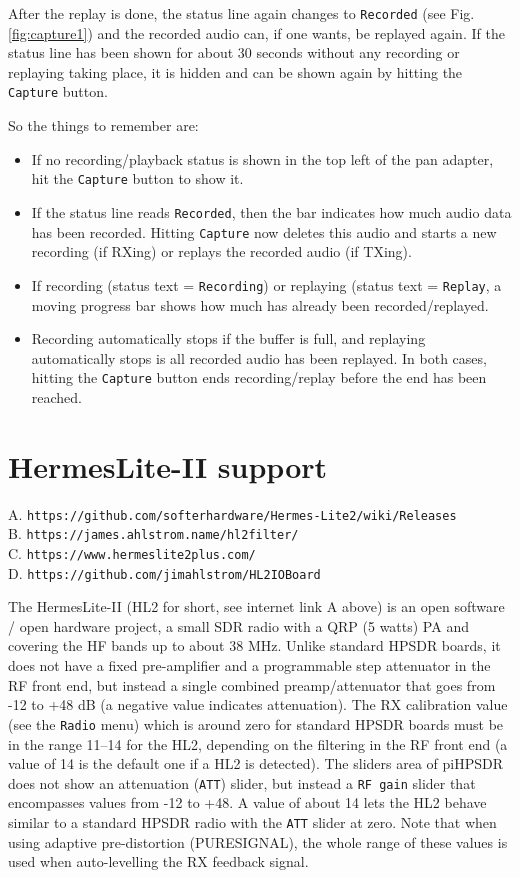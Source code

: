 \documentclass[12pt]{book}
\def\rett#1{\texttt{\color{red}#1}}
\def\bltt#1{\texttt{\color{blue}#1}}
\def\pH{pi\-HPSDR\xspace}
\begin{document}
After the replay is done, the status line again changes to \rett{Recorded} (see Fig. \ref{fig:capture1})
and the recorded audio can, if one wants, be replayed again. If the status line has been shown for about
30 seconds without any recording or replaying taking place, it is hidden and can be shown again by
hitting the \bltt{Capture} button.

So the things to remember are:
\begin{itemize}
\item{If no recording/playback status is shown in the top left of the pan adapter, hit the  \bltt{Capture} button
to show it.}
\item{If the status line reads \rett{Recorded}, then the bar indicates how much audio data has been recorded. Hitting
\bltt{Capture} now deletes this audio and starts a new recording (if RXing) or replays the recorded audio
(if TXing).}
\item{If recording (status text = \rett{Recording}) or replaying (status text = \rett{Replay}, a moving progress
bar shows how much has already been recorded/replayed.}
\item{Recording automatically stops if the buffer is full, and replaying automatically stops is all recorded audio
has been replayed. In both cases, hitting the \bltt{Capture} button ends recording/replay before the end has been reached.}
\end{itemize}
\section{HermesLite-II support}
\label{sec:hl2support}

A. \texttt{https://github.com/softerhardware/Hermes-Lite2/wiki/Releases} \\
B. \texttt{https://james.ahlstrom.name/hl2filter/}  \\
C. \texttt{https://www.hermeslite2plus.com/}\\
D. \texttt{https://github.com/jimahlstrom/HL2IOBoard}



The HermesLite-II (HL2 for  short, see internet link A above) is an open software / open hardware project,
a small SDR radio with a QRP (5 watts) PA
and covering the HF bands up to about 38 MHz. Unlike standard HPSDR boards, it does not have a fixed
pre-amplifier and a programmable step attenuator in the RF front end, but instead a single combined
preamp/attenuator that goes from -12 to +48 dB (a negative value indicates attenuation). The RX
calibration value (see the \bltt{Radio} menu) which is around zero for standard HPSDR boards must
be in the range 11--14 for the HL2, depending on the filtering in the RF front end
(a value of 14 is the default one if a HL2 is detected). The sliders
area of \pH does not show an attenuation (\texttt{ATT}) slider, but instead a \texttt{RF gain}
slider that encompasses values from -12 to +48. A value of about 14 lets the HL2 behave similar
to a standard HPSDR radio with the \texttt{ATT} slider at zero. Note that when using adaptive
pre-distortion (PURESIGNAL), the whole range of these values is used when auto-levelling the
RX feedback signal.
\end{document}
